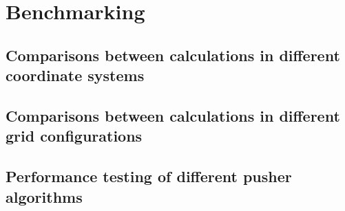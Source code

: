 \documentclass[./main.tex]{subfiles}
\begin{document}
\chapter{Benchmarking}
\section{Comparisons between calculations in different coordinate systems}
\section{Comparisons between calculations in different grid configurations}
\section{Performance testing of different pusher algorithms}

\newpage
\end{document}
